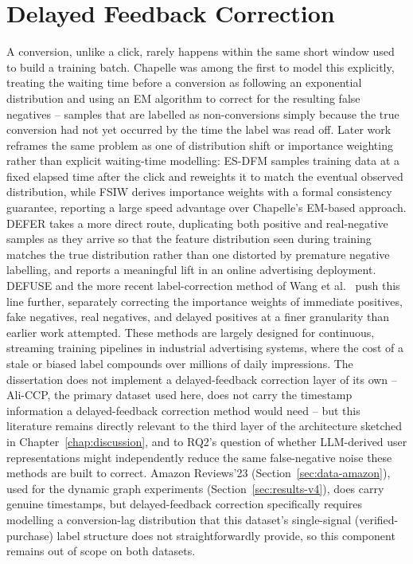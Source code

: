 \documentclass{uclthesis}
\begin{document}
\section{Delayed Feedback Correction}
A conversion, unlike a click, rarely happens within the same short window used to build a training batch. Chapelle \citep{chapelle2014modeling} was among the first to model this explicitly, treating the waiting time before a conversion as following an exponential distribution and using an EM algorithm to correct for the resulting false negatives -- samples that are labelled as non-conversions simply because the true conversion had not yet occurred by the time the label was read off. Later work reframes the same problem as one of distribution shift or importance weighting rather than explicit waiting-time modelling: ES-DFM \citep{yang2021capturing} samples training data at a fixed elapsed time after the click and reweights it to match the eventual observed distribution, while FSIW \citep{yasui2020feedback} derives importance weights with a formal consistency guarantee, reporting a large speed advantage over Chapelle's EM-based approach. DEFER \citep{gu2021defer} takes a more direct route, duplicating both positive and real-negative samples as they arrive so that the feature distribution seen during training matches the true distribution rather than one distorted by premature negative labelling, and reports a meaningful lift in an online advertising deployment. DEFUSE \citep{chen2022defuse} and the more recent label-correction method of Wang et al.\ \citep{wang2023unbiased} push this line further, separately correcting the importance weights of immediate positives, fake negatives, real negatives, and delayed positives at a finer granularity than earlier work attempted.
These methods are largely designed for continuous, streaming training pipelines in industrial advertising systems, where the cost of a stale or biased label compounds over millions of daily impressions. The dissertation does not implement a delayed-feedback correction layer of its own -- Ali-CCP, the primary dataset used here, does not carry the timestamp information a delayed-feedback correction method would need -- but this literature remains directly relevant to the third layer of the architecture sketched in Chapter~\ref{chap:discussion}, and to RQ2's question of whether LLM-derived user representations might independently reduce the same false-negative noise these methods are built to correct. Amazon Reviews'23 (Section~\ref{sec:data-amazon}), used for the dynamic graph experiments (Section~\ref{sec:results-v4}), does carry genuine timestamps, but delayed-feedback correction specifically requires modelling a conversion-lag distribution that this dataset's single-signal (verified-purchase) label structure does not straightforwardly provide, so this component remains out of scope on both datasets.
\end{document}
